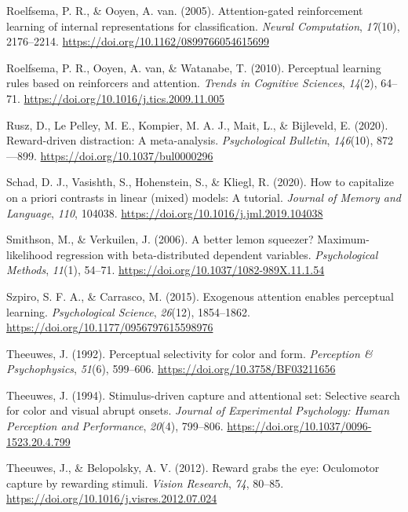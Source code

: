 \documentclass[
  man,
  floatsintext,
  longtable,
  nolmodern,
  notxfonts,
  notimes,
  mask,
  colorlinks=true,linkcolor=blue,citecolor=blue,urlcolor=blue]{apa7}
\newlength{\cslhangindent}
\newenvironment{CSLReferences}[2] %
 {\begin{list}{}{%
  \setlength{\itemindent}{0pt}
  \setlength{\leftmargin}{0pt}
  \setlength{\parsep}{0pt}
  \ifodd #1
   \setlength{\leftmargin}{\cslhangindent}
   \setlength{\itemindent}{-1\cslhangindent}
  \fi
  \setlength{\itemsep}{#2\baselineskip}}}
 {\end{list}}
\begin{document}
\begin{CSLReferences}{1}{0}
Roelfsema, P. R., \& Ooyen, A. van. (2005). Attention-gated
reinforcement learning of internal representations for classification.
\emph{Neural Computation}, \emph{17}(10), 2176--2214.
\url{https://doi.org/10.1162/0899766054615699}

Roelfsema, P. R., Ooyen, A. van, \& Watanabe, T. (2010). Perceptual
learning rules based on reinforcers and attention. \emph{Trends in
Cognitive Sciences}, \emph{14}(2), 64--71.
\url{https://doi.org/10.1016/j.tics.2009.11.005}

Rusz, D., Le Pelley, M. E., Kompier, M. A. J., Mait, L., \& Bijleveld,
E. (2020). Reward-driven distraction: A meta-analysis.
\emph{Psychological Bulletin}, \emph{146}(10), 872---899.
\url{https://doi.org/10.1037/bul0000296}

Schad, D. J., Vasishth, S., Hohenstein, S., \& Kliegl, R. (2020). How to
capitalize on a priori contrasts in linear (mixed) models: A tutorial.
\emph{Journal of Memory and Language}, \emph{110}, 104038.
\url{https://doi.org/10.1016/j.jml.2019.104038}

Smithson, M., \& Verkuilen, J. (2006). A better lemon squeezer?
Maximum-likelihood regression with beta-distributed dependent variables.
\emph{Psychological Methods}, \emph{11}(1), 54--71.
\url{https://doi.org/10.1037/1082-989X.11.1.54}

Szpiro, S. F. A., \& Carrasco, M. (2015). Exogenous attention enables
perceptual learning. \emph{Psychological Science}, \emph{26}(12),
1854--1862. \url{https://doi.org/10.1177/0956797615598976}

Theeuwes, J. (1992). Perceptual selectivity for color and form.
\emph{Perception \& Psychophysics}, \emph{51}(6), 599--606.
\url{https://doi.org/10.3758/BF03211656}

Theeuwes, J. (1994). Stimulus-driven capture and attentional set:
Selective search for color and visual abrupt onsets. \emph{Journal of
Experimental Psychology: Human Perception and Performance},
\emph{20}(4), 799--806. \url{https://doi.org/10.1037/0096-1523.20.4.799}

Theeuwes, J., \& Belopolsky, A. V. (2012). Reward grabs the eye:
Oculomotor capture by rewarding stimuli. \emph{Vision Research},
\emph{74}, 80--85. \url{https://doi.org/10.1016/j.visres.2012.07.024}


\end{CSLReferences}
\end{document}
